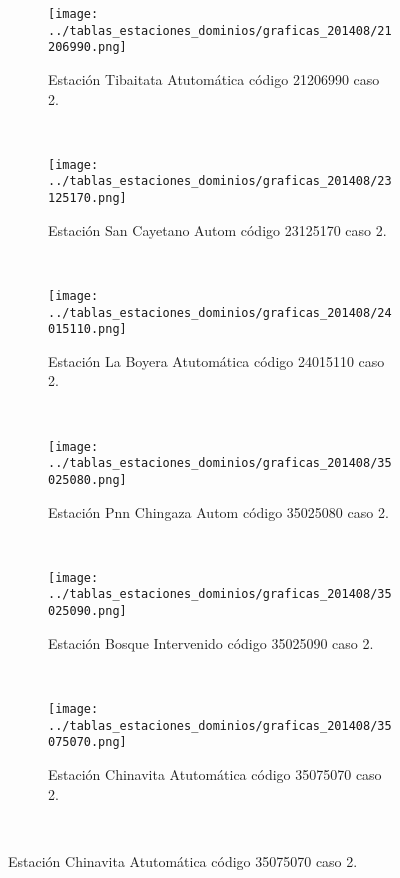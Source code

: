 \begin{figure}[H]\ContinuedFloat
\centering
\begin{subfigure}[normla]{0.4\textwidth}
\texttt{[image: ../tablas\_estaciones\_dominios/graficas\_201408/21206990.png]}
\caption{Estación Tibaitata Atutomática código 21206990 caso 2.}
\end{subfigure}
~
\begin{subfigure}[normla]{0.4\textwidth}
\texttt{[image: ../tablas\_estaciones\_dominios/graficas\_201408/23125170.png]}
\caption{Estación San Cayetano Autom código 23125170 caso 2.}
\end{subfigure}
~
\begin{subfigure}[normla]{0.4\textwidth}
\texttt{[image: ../tablas\_estaciones\_dominios/graficas\_201408/24015110.png]}
\caption{Estación La Boyera Atutomática código 24015110 caso 2.}
\end{subfigure}
~
\begin{subfigure}[normla]{0.4\textwidth}
\texttt{[image: ../tablas\_estaciones\_dominios/graficas\_201408/35025080.png]}
\caption{Estación Pnn Chingaza Autom código 35025080 caso 2.}
\end{subfigure}
~
\begin{subfigure}[normla]{0.4\textwidth}
\texttt{[image: ../tablas\_estaciones\_dominios/graficas\_201408/35025090.png]}
\caption{Estación Bosque Intervenido código 35025090 caso 2.}
\end{subfigure}
~
\begin{subfigure}[normla]{0.4\textwidth}
\texttt{[image: ../tablas\_estaciones\_dominios/graficas\_201408/35075070.png]}
\caption{Estación Chinavita Atutomática código 35075070 caso 2.}
\end{subfigure}
~
\end{figure}
 

